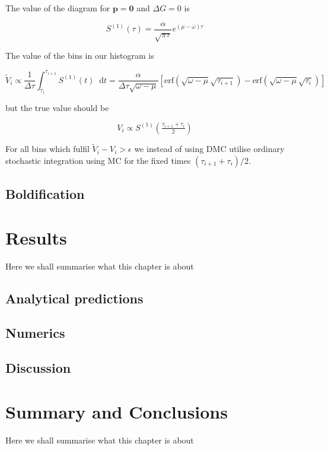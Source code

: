 \documentclass[12pt]{report}
\renewcommand{\vec}[1]{\boldsymbol{\mathbf{#1}}}                        %
\newcommand*\diff{\mathop{}\!\mathrm{d}}
\newcommand{\todo}[1]{\textcolor{todo}{#1}}
\begin{document}
The value of the diagram for $ \vec p = \vec 0 $ and $ \Delta G = 0 $ is

\begin{equation}
	S^{(1)}(\tau) = \frac{\alpha}{\sqrt{\pi \tau}} e^{(\mu - \omega)\tau}
\end{equation}

The value of the bins in our histogram is

\begin{equation}
	\tilde V_i \propto \frac{1}{\Delta \tau} \int_{\tau_i}^{\tau_{i + 1}} S^{(1)} (t) \diff t
	= \frac{\alpha}{\Delta \tau \sqrt{\omega - \mu}} \left[ \text{erf}\left(\sqrt{\omega - \mu} \sqrt{\tau_{i+1}}\right) - \text{erf}\left(\sqrt{\omega - \mu} \sqrt{\tau_i}\right) \right]
\end{equation}

 but the true value should be
 
\begin{equation}
	V_i \propto S^{(1)} \left( \tfrac{\tau_{i+1} + \tau_i}{2} \right)	
\end{equation}

For all bins which fulfil $ \tilde V_i  - V_i > \epsilon $ we instead of using DMC utilise ordinary stochastic integration using MC for the fixed times $ (\tau_{i+1} + \tau_i)/2 $.

\section{Boldification}




\chapter{Results}
\todo{Here we shall summarise what this chapter is about}

\section{Analytical predictions}

\section{Numerics}

\section{Discussion}


\chapter{Summary and Conclusions}
\todo{Here we shall summarise what this chapter is about}
\end{document}
